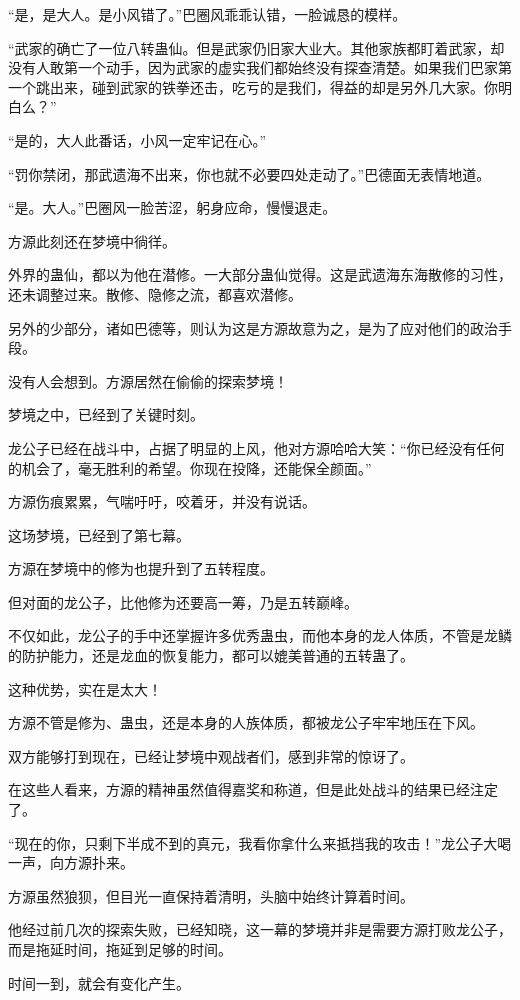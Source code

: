 \begin{this_body}
“是，是大人。是小风错了。”巴圈风乖乖认错，一脸诚恳的模样。

“武家的确亡了一位八转蛊仙。但是武家仍旧家大业大。其他家族都盯着武家，却没有人敢第一个动手，因为武家的虚实我们都始终没有探查清楚。如果我们巴家第一个跳出来，碰到武家的铁拳还击，吃亏的是我们，得益的却是另外几大家。你明白么？”

“是的，大人此番话，小风一定牢记在心。”

“罚你禁闭，那武遗海不出来，你也就不必要四处走动了。”巴德面无表情地道。

“是。大人。”巴圈风一脸苦涩，躬身应命，慢慢退走。

方源此刻还在梦境中徜徉。

外界的蛊仙，都以为他在潜修。一大部分蛊仙觉得。这是武遗海东海散修的习性，还未调整过来。散修、隐修之流，都喜欢潜修。

另外的少部分，诸如巴德等，则认为这是方源故意为之，是为了应对他们的政治手段。

没有人会想到。方源居然在偷偷的探索梦境！

梦境之中，已经到了关键时刻。

龙公子已经在战斗中，占据了明显的上风，他对方源哈哈大笑：“你已经没有任何的机会了，毫无胜利的希望。你现在投降，还能保全颜面。”

方源伤痕累累，气喘吁吁，咬着牙，并没有说话。

这场梦境，已经到了第七幕。

方源在梦境中的修为也提升到了五转程度。

但对面的龙公子，比他修为还要高一筹，乃是五转巅峰。

不仅如此，龙公子的手中还掌握许多优秀蛊虫，而他本身的龙人体质，不管是龙鳞的防护能力，还是龙血的恢复能力，都可以媲美普通的五转蛊了。

这种优势，实在是太大！

方源不管是修为、蛊虫，还是本身的人族体质，都被龙公子牢牢地压在下风。

双方能够打到现在，已经让梦境中观战者们，感到非常的惊讶了。

在这些人看来，方源的精神虽然值得嘉奖和称道，但是此处战斗的结果已经注定了。

“现在的你，只剩下半成不到的真元，我看你拿什么来抵挡我的攻击！”龙公子大喝一声，向方源扑来。

方源虽然狼狈，但目光一直保持着清明，头脑中始终计算着时间。

他经过前几次的探索失败，已经知晓，这一幕的梦境并非是需要方源打败龙公子，而是拖延时间，拖延到足够的时间。

时间一到，就会有变化产生。


\end{this_body}
